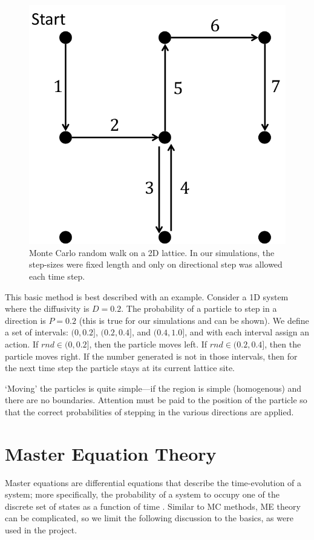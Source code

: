 	\begin{figure}[h]
		\centering
		\includegraphics[width=0.5\linewidth]{../images/mc-random-walk}
		\caption[Monte Carlo random walk on a 2D lattice]{Monte Carlo random walk on a 2D lattice. In our simulations, the step-sizes were fixed length and only on directional step was allowed each time step.}
		\label{fig:mc-random-walk}
	\end{figure}

	This basic method is best described with an example. Consider a 1D system where the diffusivity is $ D = 0.2 $. The probability of a particle to step in a direction is $ P = 0.2 $ (this is true for our simulations and can be shown). We define a set of intervals: $ (0,0.2] $, $ (0.2,0.4] $, and $ (0.4,1.0] $, and with each interval assign an action. If $ rnd \in (0,0.2] $, then the particle moves left. If $ rnd \in (0.2,0.4] $, then the particle moves right. If the number generated is not in those intervals, then for the next time step the particle stays at its current lattice site.
	
	`Moving' the particles is quite simple---if the region is simple (homogenous) and there are no boundaries. Attention must be paid to the position of the particle so that the correct probabilities of stepping in the various directions are applied.
	
\section{Master Equation Theory}
\label{sec:intro-me}
	
	Master equations are differential equations that describe the time-evolution of a system; more specifically, the probability of a system to occupy one of the discrete set of states as a function of time \citep{master-equations}. Similar to MC methods, ME theory can be complicated, so we limit the following discussion to the basics, as were used in the project. 
	
